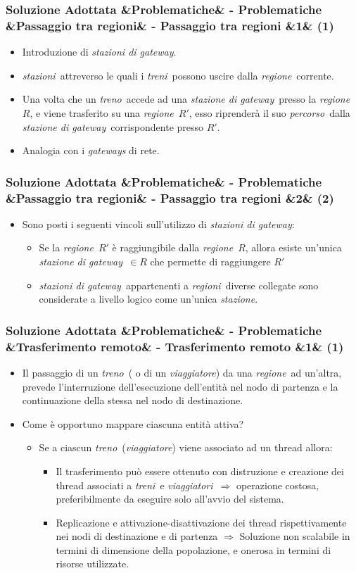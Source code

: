 \documentclass[slidestop,compress,blackandwhite]{beamer}
\newcommand{\ii}[1]{\textit{#1}}
\newcommand{\treno}{\ii{treno}}
\newcommand{\treni}{\ii{treni}}
\newcommand{\viaggiatore}{\ii{viaggiatore}}
\newcommand{\viaggiatori}{\ii{viaggiatori}}
\newcommand{\stazione}{\ii{stazione}}
\newcommand{\stazioni}{\ii{stazioni}}
\newcommand{\route}{\ii{percorso}}
\newcommand{\regione}{\ii{regione}}
\newcommand{\regioni}{\ii{regioni}}
\newcommand{\gateway}{\ii{stazione di gateway}}
\newcommand{\gateways}{\ii{stazioni di gateway}}
\newcommand{\newtitle}[4]{
	#1 
	\ifx&#2&%
	\else
  		\large- #2
	\fi
	\ifx&#3&%
	\else
  		\normalsize- #3
	\fi
	\ifx&#4&%
	\else
  		\normalsize (#4)
	\fi
}
\newcommand{\newframe}[5]{
	\begin{frame}
		\frametitle{\newtitle{#1}{#2}{#3}{#4}}
		#5
	\end{frame}
}
\newcommand{\myitemize}[1]{\begin{itemize}#1\end{itemize}}
\begin{document}
	\newframe{Soluzione Adottata}{Problematiche}{Passaggio tra regioni}{1}{
		\vspace{0.5cm}
		\myitemize{
			\item Introduzione di \gateways.
			\vspace{0.3cm}
			\item \stazioni~attreverso le quali i \treni~possono uscire dalla \regione~corrente.
			\vspace{0.3cm}
			\item Una volta che un \treno~accede ad una \gateway~presso la \regione~$R$, e viene trasferito su una \regione~$R'$, esso riprenderà il suo \route~dalla \gateway~corrispondente presso $R'$. 
			\item Analogia con i \ii{gateways} di rete.
		}
	}
	
	\newframe{Soluzione Adottata}{Problematiche}{Passaggio tra regioni}{2}{
		\vspace{0.5cm}
		\myitemize{
			\item Sono posti i seguenti vincoli sull'utilizzo di \gateways:
				\myitemize{
					\item Se la \regione~$R'$ è raggiungibile dalla \regione~$R$, allora esiste un'unica \gateway~$\in R$ che permette di raggiungere $R'$
					\item \gateways~appartenenti a \regioni~diverse collegate sono considerate a livello logico come un'unica \stazione.
				
				}
		}
	}
	
	
	\newframe{Soluzione Adottata}{Problematiche}{Trasferimento remoto}{1}{
		\myitemize{
			\item Il passaggio di un \treno~( o di un \viaggiatore) da una \regione~ad un'altra, prevede l'interruzione dell'esecuzione dell'entità nel nodo di partenza e la continuazione della stessa nel nodo di destinazione.
			\item Come è opportuno mappare ciascuna entità attiva?
				\myitemize{
					\item Se a ciascun \treno~(\viaggiatore) viene associato ad un thread allora:
						\myitemize{
							\item Il trasferimento può essere ottenuto con distruzione e creazione dei thread associati a \treni~e \viaggiatori~$\Rightarrow$ operazione costosa, preferibilmente da eseguire solo all'avvio del sistema.
							\item Replicazione e attivazione-disattivazione dei thread rispettivamente nei nodi di destinazione e di partenza $\Rightarrow$ Soluzione non scalabile in termini di dimensione della popolazione, e onerosa in termini di risorse utilizzate. 
						} 
				}
		}
	}
	
\end{document}
